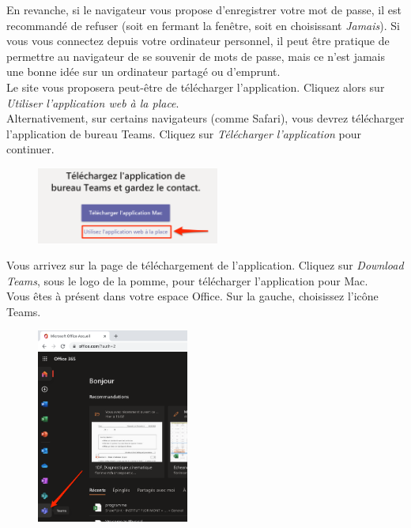 En revanche, si le navigateur vous propose d'enregistrer votre mot de passe, il est recommandé de refuser (soit en fermant la fenêtre, soit en choisissant \textit{Jamais}). Si vous vous connectez depuis votre ordinateur personnel, il peut être pratique de permettre au navigateur de se souvenir de mots de passe, mais ce n'est jamais une bonne idée sur un ordinateur partagé ou d'emprunt.\\

Le site vous proposera peut-être de télécharger l’application. Cliquez alors sur \textit{Utiliser l’application web à la place}.\\

Alternativement, sur certains navigateurs (comme Safari), vous devrez télécharger l'application de bureau Teams. Cliquez sur \textit{Télécharger l'application} pour continuer.

\begin{figure}[h]
\includegraphics[width=6cm]{./images/teams/ecran_installer_teams_crop}
\centering
\end{figure}

Vous arrivez sur la page de téléchargement de l'application. Cliquez sur \textit{Download Teams}, sous le logo de la pomme, pour télécharger l'application pour Mac.\\

Vous êtes à présent dans votre espace Office. Sur la gauche, choisissez l'icône Teams.

\begin{figure}[H]
\includegraphics[width=5cm]{./images/teams/ecran_accueil_office_crop}
\centering
\end{figure}


